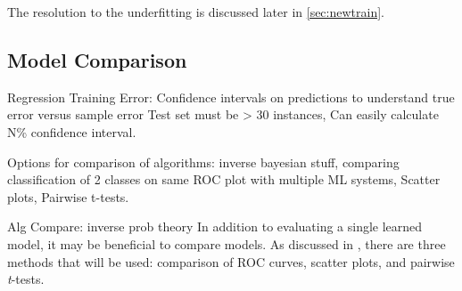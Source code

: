 The resolution to the underfitting is discussed later in \ref{sec:newtrain}.

\subsection{Model Comparison}
\label{sec:algcompare}

Regression Training Error: Confidence intervals on predictions to understand
true error versus sample error Test set must be > 30 instances, Can easily
calculate N\% confidence interval.

Options for comparison of algorithms: inverse bayesian stuff, comparing
classification of 2 classes on same ROC plot with multiple ML systems, Scatter
plots, Pairwise t-tests.

Alg Compare: inverse prob theory
In addition to evaluating a single learned model, it may be beneficial to
compare models. As discussed in , there
are three methods that will be used: comparison of \gls{ROC} curves, scatter
plots, and pairwise \textit{t}-tests.


